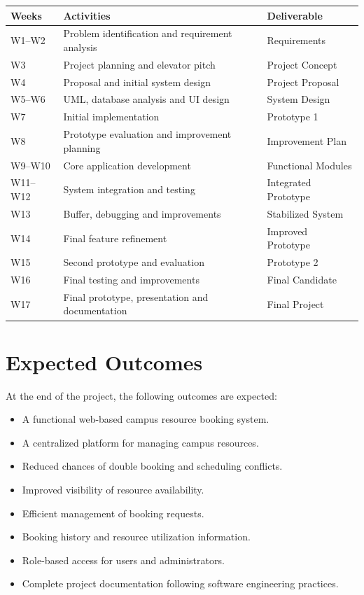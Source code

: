 \documentclass[12pt,a4paper]{article}
\begin{document}
\begin{table}[h]
\centering
\renewcommand{\arraystretch}{1.3}
\begin{tabular}{p{2cm} p{7cm} p{3cm}}
\toprule
\textbf{Weeks} & \textbf{Activities} & \textbf{Deliverable} \\
\midrule
W1--W2 & Problem identification and requirement analysis & Requirements \\
W3 & Project planning and elevator pitch & Project Concept \\
W4 & Proposal and initial system design & Project Proposal \\
W5--W6 & UML, database analysis and UI design & System Design \\
W7 & Initial implementation & Prototype 1 \\
W8 & Prototype evaluation and improvement planning & Improvement Plan \\
W9--W10 & Core application development & Functional Modules \\
W11--W12 & System integration and testing & Integrated Prototype \\
W13 & Buffer, debugging and improvements & Stabilized System \\
W14 & Final feature refinement & Improved Prototype \\
W15 & Second prototype and evaluation & Prototype 2 \\
W16 & Final testing and improvements & Final Candidate \\
W17 & Final prototype, presentation and documentation & Final Project \\
\bottomrule
\end{tabular}
\end{table}



\section{Expected Outcomes}

At the end of the project, the following outcomes are expected:

\begin{itemize}
    \item A functional web-based campus resource booking system.
    \item A centralized platform for managing campus resources.
    \item Reduced chances of double booking and scheduling conflicts.
    \item Improved visibility of resource availability.
    \item Efficient management of booking requests.
    \item Booking history and resource utilization information.
    \item Role-based access for users and administrators.
    \item Complete project documentation following software engineering practices.
\end{itemize}
\end{document}
